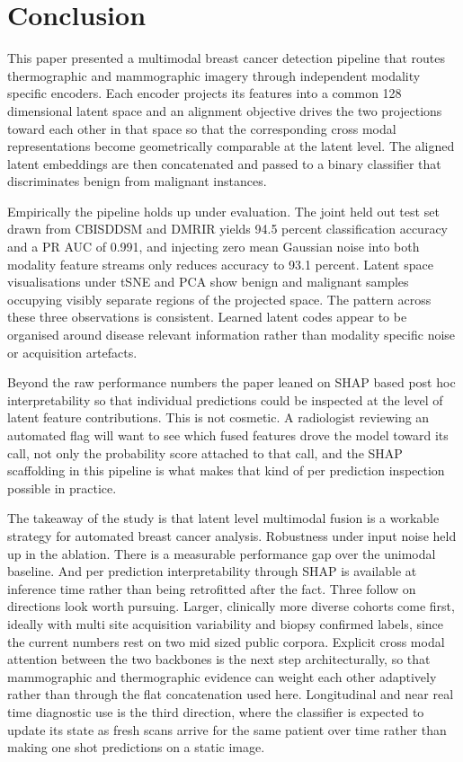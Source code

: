 \documentclass[lettersize,journal]{IEEEtran}
\begin{document}
\section{Conclusion}
This paper presented a multimodal breast cancer detection pipeline that routes thermographic and mammographic imagery through independent modality specific encoders. Each encoder projects its features into a common 128 dimensional latent space and an alignment objective drives the two projections toward each other in that space so that the corresponding cross modal representations become geometrically comparable at the latent level. The aligned latent embeddings are then concatenated and passed to a binary classifier that discriminates benign from malignant instances.

Empirically the pipeline holds up under evaluation. The joint held out test set drawn from CBIS\textendash DDSM and DMR\textendash IR yields 94.5 percent classification accuracy and a PR AUC of 0.991, and injecting zero mean Gaussian noise into both modality feature streams only reduces accuracy to 93.1 percent. Latent space visualisations under t\textendash SNE and PCA show benign and malignant samples occupying visibly separate regions of the projected space. The pattern across these three observations is consistent. Learned latent codes appear to be organised around disease relevant information rather than modality specific noise or acquisition artefacts.

Beyond the raw performance numbers the paper leaned on SHAP based post hoc interpretability so that individual predictions could be inspected at the level of latent feature contributions. This is not cosmetic. A radiologist reviewing an automated flag will want to see which fused features drove the model toward its call, not only the probability score attached to that call, and the SHAP scaffolding in this pipeline is what makes that kind of per prediction inspection possible in practice.

The takeaway of the study is that latent level multimodal fusion is a workable strategy for automated breast cancer analysis. Robustness under input noise held up in the ablation. There is a measurable performance gap over the unimodal baseline. And per prediction interpretability through SHAP is available at inference time rather than being retrofitted after the fact. Three follow on directions look worth pursuing. Larger, clinically more diverse cohorts come first, ideally with multi site acquisition variability and biopsy confirmed labels, since the current numbers rest on two mid sized public corpora. Explicit cross modal attention between the two backbones is the next step architecturally, so that mammographic and thermographic evidence can weight each other adaptively rather than through the flat concatenation used here. Longitudinal and near real time diagnostic use is the third direction, where the classifier is expected to update its state as fresh scans arrive for the same patient over time rather than making one shot predictions on a static image.
\end{document}
